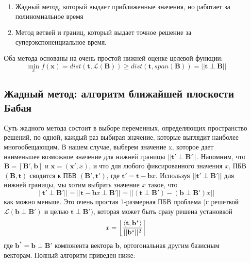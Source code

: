 \begin{enumerate}
\item Жадный метод, который выдает приближенные значения, но работает за полиномиальное время
\item Метод ветвей и границ, который выдает точное решение за суперэкспоненциальное время.
\end{enumerate}

Оба метода основаны на очень простой нижней оценке целевой функции:
$$ \min \limits_{x}f(\mathbf{x}) = dist\left(\mathbf{t}, \mathcal{L}\left(\mathbf{B}\right)\right)\geq dist \left(\mathbf{t}, span\left(\mathbf{B}\right)\right) = ||\mathbf{t} \perp \mathbf{B} || $$

\subsection{Жадный метод: алгоритм ближайшей плоскости Бабая}

Суть жадного метода состоит в выборе переменных, определяющих пространство решений, по одной, каждый раз выбирая значение, которые выглядит наиболее многообещающим. В нашем случае, выберем значение x, которое дает наименьшее возможное значение для нижней границы $ ||\mathbf{t}' \perp \mathbf{B}' || $. Напомним, что $ \mathbf{B}=\left[\mathbf{B}', \mathbf{b}\right] $ и $ \mathbf{x}=\left(\mathbf{x}' ,x\right) $, и что для любого фиксированного значения $ x $, ПБВ $ (\mathbf{B}, \mathbf{t}) $ сводится к ПБВ $ (\mathbf{B}',\mathbf{t}') $, где $ \mathbf{t}'=\mathbf{t}-\mathbf{b}x $. Используя $ ||\mathbf{t}' \perp \mathbf{B}' || $ для нижней границы, мы хотим выбрать значение $ x $ такое, что 
$$ || \mathbf{t}' \perp \mathbf{B}' || = || \mathbf{t} - \mathbf{b}x \perp \mathbf{B}' || = || (\mathbf{t} \perp \mathbf{B}') - (\mathbf{b} \perp \mathbf{B}')x || $$ 
как можно меньше. Это очень простая 1-размерная ПБВ проблема (с решеткой $ \mathcal{L}\left(\mathbf{b} \perp \mathbf{B}'\right) $ и целью $ \mathbf{t} \perp \mathbf{B}') $, которая может быть сразу решена установкой
$$ x = \left\lfloor \left\langle \mathbf{t},\mathbf{b}^* \right\rangle \over ||\mathbf{b}^*||^2 \right\rceil $$
где $ \mathbf{b}^* = \mathbf{b} \perp \mathbf{B}' $ компонента вектора $ \mathbf{b} $, ортогональная другим базисным векторам. Полный алгоритм приведен ниже: \newline

\begin{algorithmic}

\end{algorithmic}

